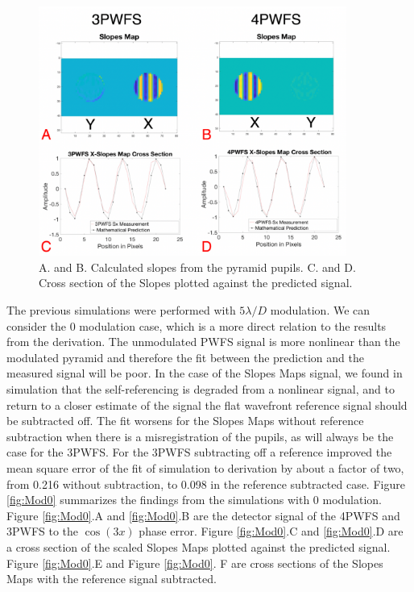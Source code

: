 \begin{figure}
    \centering
    \includegraphics[width=0.9\textwidth]{Chapter Materials/Chapter Two Materials/SlopesMapsAndSlices.png}
    \caption{A. and B. Calculated slopes from the pyramid pupils. C. and D. Cross section of the Slopes plotted against the predicted signal. }
    \label{fig:SlopesMapDiagram}
\end{figure}

The previous simulations were performed with $5\lambda/D$ modulation. We can consider the 0 modulation case, which is a more direct relation to the results from the derivation. The unmodulated PWFS signal is more nonlinear than the modulated pyramid and therefore the fit between the prediction and the measured signal will be poor. In the case of the Slopes Maps signal, we found in simulation that the self-referencing is degraded from a nonlinear signal, and to return to a closer estimate of the signal the flat wavefront reference signal should be subtracted off. The fit worsens for the Slopes Maps without reference subtraction when there is a misregistration of the pupils, as will always be the case for the 3PWFS. For the 3PWFS subtracting off a reference improved the mean square error of the fit of simulation to derivation by about a factor of two, from 0.216 without subtraction, to 0.098 in the reference subtracted case. Figure \ref{fig:Mod0} summarizes the findings from the simulations with 0 modulation. Figure \ref{fig:Mod0}.A and \ref{fig:Mod0}.B are the detector signal of the 4PWFS and 3PWFS to the $\cos(3x)$ phase error. Figure \ref{fig:Mod0}.C and \ref{fig:Mod0}.D are a cross section of the scaled Slopes Maps plotted against the predicted signal. Figure \ref{fig:Mod0}.E and Figure \ref{fig:Mod0}. F are cross sections of the Slopes Maps with the reference signal subtracted.

